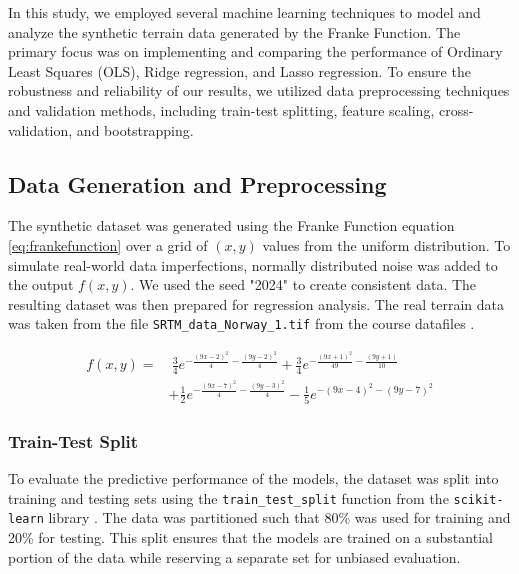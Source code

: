 In this study, we employed several machine learning techniques to model and analyze the synthetic terrain data generated by the Franke Function. The primary focus was on implementing and comparing the performance of Ordinary Least Squares (OLS), Ridge regression, and Lasso regression. To ensure the robustness and reliability of our results, we utilized data preprocessing techniques and validation methods, including train-test splitting, feature scaling, cross-validation, and bootstrapping.

\subsection{Data Generation and Preprocessing}

The synthetic dataset was generated using the Franke Function equation \ref{eq:frankefunction} over a grid of $(x, y)$ values from the uniform distribution. To simulate real-world data imperfections, normally distributed noise was added to the output $f(x, y)$. We used the seed "2024" to create consistent data. The resulting dataset was then prepared for regression analysis. The real terrain data was taken from the file \texttt{SRTM\_data\_Norway\_1.tif} from the course datafiles \cite{CompPhysics2023}.

\begin{equation}
\begin{split}    
    f(x, y) = & \ \frac{3}{4} e^{-\frac{(9x-2)^2}{4} - \frac{(9y-2)^2}{4}} + \frac{3}{4} e^{-\frac{(9x+1)^2}{49} - \frac{(9y+1)}{10}} \\
    & + \frac{1}{2} e^{-\frac{(9x-7)^2}{4} - \frac{(9y-3)^2}{4}} - \frac{1}{5} e^{-(9x-4)^2 - (9y-7)^2}
   \label{eq:frankefunction}
\end{split}
\end{equation}

\subsubsection{Train-Test Split}

To evaluate the predictive performance of the models, the dataset was split into training and testing sets using the \texttt{train\_test\_split} function from the \texttt{scikit-learn} library \cite{scikit-learn}. The data was partitioned such that 80\% was used for training and 20\% for testing. This split ensures that the models are trained on a substantial portion of the data while reserving a separate set for unbiased evaluation.

